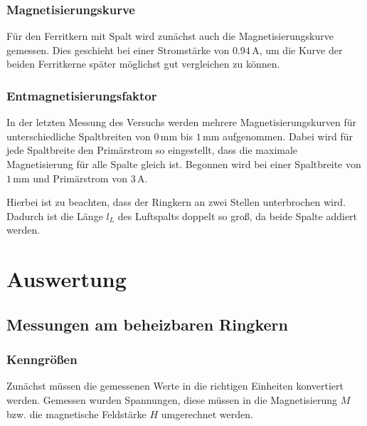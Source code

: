 \documentclass[12pt,a4paper]{scrartcl}
\numberwithin{equation}{section} %
\renewcommand{\[}{} %
\renewcommand{\]}{\noindent} %
\begin{document}
\hypertarget{magnetisierungskurve-1}{%
\subsubsection{Magnetisierungskurve}\label{magnetisierungskurve-1}}

Für den Ferritkern mit Spalt wird zunächst auch die Magnetisierungskurve gemessen. Dies geschieht bei einer Stromstärke von \(0.94\,\mathrm A\), um die Kurve der beiden Ferritkerne später möglichst gut vergleichen zu können.

\hypertarget{entmagnetisierungsfaktor-1}{%
\subsubsection{Entmagnetisierungsfaktor}\label{entmagnetisierungsfaktor-1}}
In der letzten Messung des Versuchs werden mehrere Magnetisierungskurven für unterschiedliche Spaltbreiten von \(0\,\mathrm{mm}\) bis \(1\,\mathrm{mm}\) aufgenommen. Dabei wird für jede Spaltbreite den Primärstrom so eingestellt, dass die maximale Magnetisierung für alle Spalte gleich ist. Begonnen wird bei einer Spaltbreite von \(1\,\mathrm{mm}\) und Primärstrom von \(3\,\mathrm A\).

Hierbei ist zu beachten, dass der Ringkern an zwei Stellen unterbrochen wird. Dadurch ist die Länge \(l_L\) des Luftspalts doppelt so groß, da beide Spalte addiert werden.

\hypertarget{auswertung}{%
\section{Auswertung}\label{auswertung}}

\hypertarget{messungen-am-beheizbaren-ringkern}{%
\subsection{Messungen am beheizbaren
Ringkern}\label{messungen-am-beheizbaren-ringkern}}

\hypertarget{kenngruxf6uxdfen}{%
\subsubsection{Kenngrößen}\label{kenngruxf6uxdfen}}
Zunächst müssen die gemessenen Werte in die richtigen Einheiten konvertiert werden. Gemessen wurden Spannungen, diese müssen in die Magnetisierung \(M\) bzw. die magnetische Feldstärke \(H\) umgerechnet werden.
\end{document}
